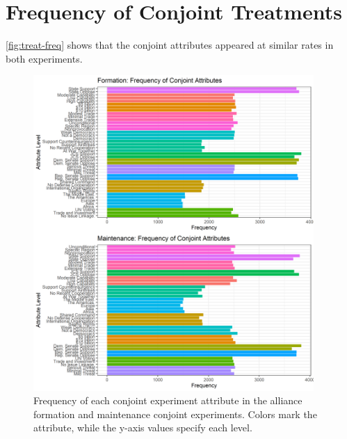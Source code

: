 \documentclass[12pt]{article}
\begin{document}
\section{Frequency of Conjoint Treatments}

\autoref{fig:treat-freq} shows that the conjoint attributes appeared at similar rates in both experiments. 
 
\begin{figure}[htbp]
	\centering
		\includegraphics[width=0.95\textwidth]{treat-freq.png}
	\caption{Frequency of each conjoint experiment attribute in the alliance formation and maintenance conjoint experiments. Colors mark the attribute, while the y-axis values specify each level.}
	\label{fig:treat-freq}
\end{figure}


\newpage 
 
 
\end{document}
